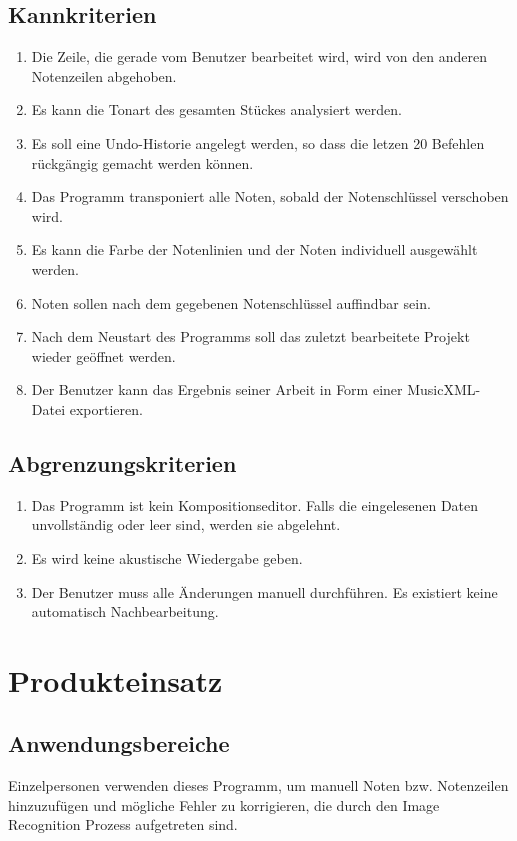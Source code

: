 \documentclass[10pt, paper = a4, oneside,final]{article}
\begin{document}
\subsection{Kannkriterien}
\begin{enumerate}[label=$\circ$]
	\item Die Zeile, die gerade vom Benutzer bearbeitet wird, wird von den anderen Notenzeilen abgehoben.
	\item Es kann die Tonart des gesamten Stückes analysiert werden.
	\item Es soll eine Undo-Historie angelegt werden, so dass die letzen 20 Befehlen rückgängig gemacht werden können.
	\item Das Programm transponiert alle Noten, sobald der Notenschlüssel verschoben wird.
	\item Es kann die Farbe der Notenlinien und der Noten individuell ausgewählt werden.
	\item Noten sollen nach dem gegebenen Notenschlüssel auffindbar sein.
	\item Nach dem Neustart des Programms soll das zuletzt bearbeitete Projekt wieder geöffnet werden.
	\item Der Benutzer kann das Ergebnis seiner Arbeit in Form einer MusicXML-Datei exportieren.
\end{enumerate}

\subsection{Abgrenzungskriterien}
\begin{enumerate}[label=$\circ$]
	\item Das Programm ist kein Kompositionseditor. Falls die eingelesenen Daten unvollständig oder leer sind, werden sie abgelehnt.
	\item Es wird keine akustische Wiedergabe geben.
	\item Der Benutzer muss alle Änderungen manuell durchführen. Es existiert keine automatisch Nachbearbeitung.
\end{enumerate}


\section{Produkteinsatz}
\subsection{Anwendungsbereiche}
Einzelpersonen verwenden dieses Programm, um manuell Noten bzw. Notenzeilen hinzuzufügen und mögliche Fehler zu korrigieren, die durch den Image Recognition Prozess aufgetreten sind.
\end{document}
